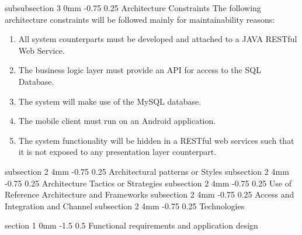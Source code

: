 \documentclass[12pt]{article}
\makeatletter
\renewcommand{\section}{\@startsection
   {section}%
   {1}%
   {0mm}%
   {-1.5\baselineskip}%
   {0.5\baselineskip}%
   {\sffamily\bfseries\upshape\normalsize}}%
\renewcommand{\subsection}{\@startsection
   {subsection}%
   {2}%
   {4mm}%
   {-0.75\baselineskip}%
   {0.25\baselineskip}%
   {\rmfamily\normalfont\scshape\normalsize}}%
\renewcommand{\subsubsection}{\@startsection
   {subsubsection}%
   {3}%
   {0mm}%
   {-0.75\baselineskip}%
   {0.25\baselineskip}%
   {\rmfamily\normalfont\slshape\normalsize}}%
\makeatother
\begin{document}
                			\subsubsection{Architecture Constraints}
                					The following architecture constraints will be followed mainly for maintainability reasons:
                					\begin{enumerate}
                							\item All system counterparts must be developed and attached to a JAVA RESTful Web Service.
                							\item The business logic layer must provide an API for access to the SQL Database.
                							\item The system will make use of the MySQL database.
                							\item The mobile client must run on an Android application.
                							\item The system functionality will be hidden in a RESTful web services such that it is not exposed to any presentation layer counterpart.
                					\end{enumerate}
                				
                			  
                	\subsection{Architectural patterns or Styles}
                    \subsection{Architecture Tactics or Strategies}
                    \subsection{Use of Reference Architecture and Frameworks }
                    \subsection{Access and Integration and Channel }
					\subsection{Technologies}
                    
                \section{Functional requirements and application design}
\end{document}
